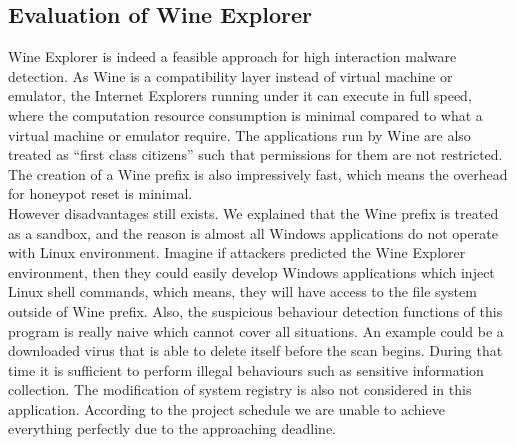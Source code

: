 \subsection{Evaluation of Wine Explorer}
Wine Explorer is indeed a feasible approach for high interaction malware 
detection. As Wine is a compatibility layer instead of virtual machine or 
emulator, the Internet Explorers running under it can execute in full speed, 
where the computation resource consumption is minimal compared to what 
a virtual machine or emulator require. The applications run by Wine are also 
treated as ``first class citizens''\cite{wineperformance} such that 
permissions for them are not 
restricted. The creation of a Wine prefix is also impressively fast, which 
means the overhead for honeypot reset is minimal. \\
However disadvantages still exists. We explained that the Wine prefix is treated
as a sandbox, and the reason is almost all Windows applications do not operate 
with Linux environment. Imagine if attackers predicted the Wine Explorer 
environment, then they could easily develop Windows applications which inject 
Linux shell commands, which means, they will have access to the file system 
outside of Wine prefix. Also, the suspicious behaviour detection functions of 
this program is really naive which cannot cover all situations. An example 
could 
be a downloaded virus that is able to delete itself before the scan begins. 
During that time it is sufficient to perform illegal behaviours such as 
sensitive information collection. The modification of system 
registry is also not considered in this application. According to the project 
schedule we are unable to achieve everything perfectly due to the approaching 
deadline. 
